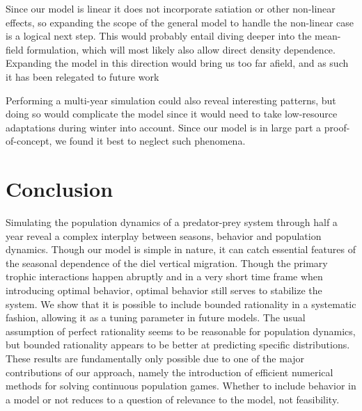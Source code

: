 Since our model is linear it does not incorporate satiation or other non-linear effects, so expanding the scope of the general model to handle the non-linear case is a logical next step. This would probably entail diving deeper into the mean-field formulation, which will most likely also allow direct density dependence. Expanding the model in this direction would bring us too far afield, and as such it has been relegated to future work

Performing a multi-year simulation could also reveal interesting patterns, but doing so would complicate the model since it would need to take low-resource adaptations during winter into account. Since our model is in large part a proof-of-concept, we found it best to neglect such phenomena.



\section{Conclusion} %
Simulating the population dynamics of a predator-prey system through half a year reveal a complex interplay between seasons, behavior and population dynamics. Though our model is simple in nature, it can catch essential features of the seasonal dependence of the diel vertical migration. Though the primary trophic interactions happen abruptly and in a very short time frame when introducing optimal behavior, optimal behavior still serves to stabilize the system.
We show that it is possible to include bounded rationality in a systematic fashion, allowing it as a tuning parameter in future models. The usual assumption of perfect rationality seems to be reasonable for population dynamics, but bounded rationality appears to be better at predicting specific distributions.
These results are fundamentally only possible due to one of the major contributions of our approach, namely the introduction of efficient numerical methods for solving continuous population games. Whether to include behavior in a model or not reduces to a question of relevance to the model, not feasibility.

